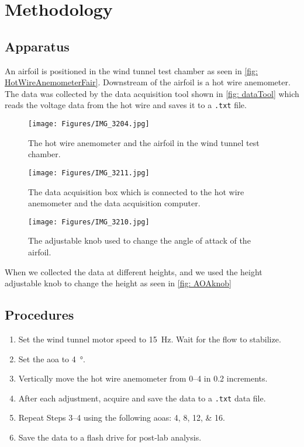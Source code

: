 \chapter{Methodology}
\label{cp:methodology}
\section{Apparatus}\label{sec:apparatus}
An airfoil is positioned in the wind tunnel test chamber as seen in \autoref{fig: HotWireAnemometerFair}. Downstream of the airfoil is a hot wire anemometer. The data was collected by the data acquisition tool shown in \autoref{fig: dataTool} which reads the voltage data from the hot wire and saves it to a \verb|.txt| file.

\begin{figure}[htpb]
    \centering
    \texttt{[image: Figures/IMG\_3204.jpg]}
    \caption[A photograph of the hot wire anemometer downstream of the airfoil.]{The hot wire anemometer and the airfoil in the wind tunnel test chamber.}
    \label{fig: HotWireAnemometerFair}
\end{figure}

\begin{figure}[htpb]
    \centering
    \texttt{[image: Figures/IMG\_3211.jpg]}
    \caption[A photograph of the data acquisition box.]{The data acquisition box which is connected to the hot wire anemometer and the data acquisition computer.}
    \label{fig: dataTool}
\end{figure}

\begin{figure}[htpb]
    \centering
    \texttt{[image: Figures/IMG\_3210.jpg]}
    \caption[A photograph of the adjustable knob used to change the angle of attack of the airfoil.]{The adjustable knob used to change the angle of attack of the airfoil.}
    \label{fig: AOAknob}
\end{figure}

When we collected the data at different heights, and we used the height adjustable knob to change the height as seen in \autoref{fig: AOAknob}

\section{Procedures}\label{sec:procedures}

\begin{enumerate}
    \item Set the wind tunnel motor speed to \qty{15}{\hertz}. Wait for the flow to stabilize.
    \item Set the \acrshort{aoa} to \qty{4}{\degree}.
    \item Vertically move the hot wire anemometer from \qtyrange{0}{4}{} in \qty{0.2}{} increments.
    \item After each adjustment, acquire and save the data to a \verb|.txt| data file.
    \item Repeat Steps 3–4 using the following \acrshort{aoa}s: \numlist{4;8;12;16}.
    \item Save the data to a flash drive for post-lab analysis.
\end{enumerate}

